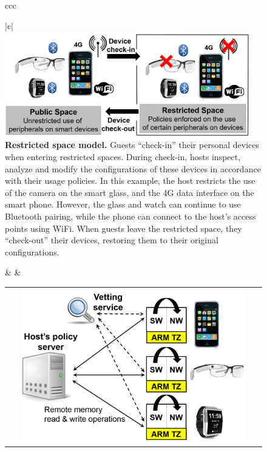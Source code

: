 \documentclass[pageno]{sig-alternate-05-2015}
\begin{document}
\begin{figure}[t!]
\centering
\begin{tabular}{ccc}
\begin{minipage}{0.46\textwidth}
\centering
\begin{tabular}{|c|}
\hline
\indent\vspace{-0.0cm}\\
\includegraphics[keepaspectratio=true,width=0.95\textwidth]{restricted-space.png}\\
{\small {\bf Restricted space model.} Guests ``check-in'' their personal
devices when entering restricted spaces. During check-in, hosts inspect,
analyze and modify the configurations of these devices in accordance with their
usage policies. In this example, the host restricts the use of the camera on
the smart glass, and the 4G data interface on the smart phone. However, the
glass and watch can continue to use Bluetooth pairing, while the phone can
connect to the host's access points using WiFi.  When guests leave the
restricted space, they ``check-out'' their devices, restoring them to their
original configurations.}\\
\hline
\end{tabular}
\end{minipage} & & 
\begin{minipage}{0.46\textwidth}
\centering
\begin{tabular}{|c|}
\hline
\indent\vspace{-0.2cm}\\
\includegraphics[keepaspectratio=true,width=0.90\textwidth]{host-guest.png}\\

\end{tabular}
\end{minipage}
\end{tabular}
\end{figure}
\end{document}
